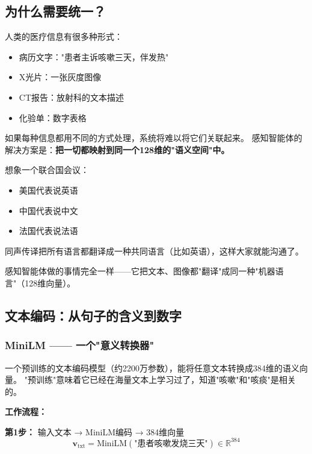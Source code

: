 \documentclass[11pt,a4paper]{ctexart}
\begin{document}
\subsection{为什么需要统一？}

人类的医疗信息有很多种形式：
\begin{itemize}[nosep]
\item 病历文字："患者主诉咳嗽三天，伴发热"
\item X光片：一张灰度图像
\item CT报告：放射科的文本描述
\item 化验单：数字表格
\end{itemize}

如果每种信息都用不同的方式处理，系统将难以将它们关联起来。
感知智能体的解决方案是：\textbf{把一切都映射到同一个128维的"语义空间"中。}

\begin{exambox}[类比：把不同语言翻译成同一种语言]
想象一个联合国会议：
\begin{itemize}[nosep]
\item 美国代表说英语
\item 中国代表说中文
\item 法国代表说法语
\end{itemize}
同声传译把所有语言都翻译成一种共同语言（比如英语），这样大家就能沟通了。

感知智能体做的事情完全一样——它把文本、图像都"翻译"成同一种"机器语言"（128维向量）。
\end{exambox}

\subsection{文本编码：从句子的含义到数字}

\subsubsection{MiniLM —— 一个"意义转换器"}

\begin{defbox}[MiniLM]
一个预训练的文本编码模型（约2200万参数），能将任意文本转换成384维的语义向量。
"预训练"意味着它已经在海量文本上学习过了，知道"咳嗽"和"咳痰"是相关的。
\end{defbox}

\textbf{工作流程：}

\textbf{第1步：} 输入文本 → MiniLM编码 → 384维向量
$$\mathbf{v}_{\text{txt}} = \text{MiniLM}(\text{"患者咳嗽发烧三天"}) \in \mathbb{R}^{384}$$
\end{document}

